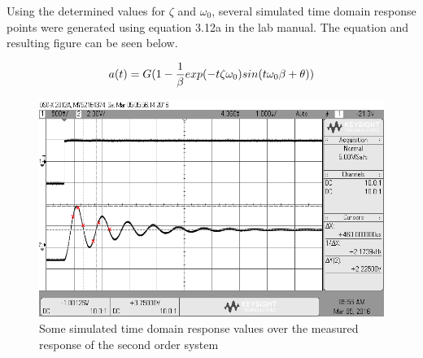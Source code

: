 \pagebreak
Using the determined values for $\zeta$ and $\omega_0$, several simulated time domain response points were generated using equation 3.12a in the lab manual. The equation and resulting figure can be seen below.

\begin{equation}\label{eqn:timedomainresponse}
a(t) = {G(1-{1 \over \beta}exp(-t\zeta\omega_0)sin(t\omega_0\beta + \theta))}
\end{equation} 

\begin{figure}
	\centering
	\includegraphics[width=0.7\linewidth]{graphics/overshoot_simulated}
	\caption{Some simulated time domain response values over the measured response of the second order system}
	\label{fig:overshoot_sim}
\end{figure}